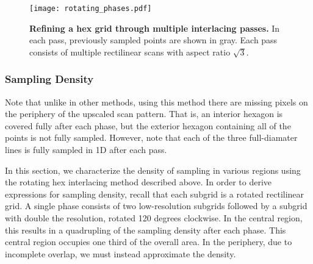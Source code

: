 \documentclass[aip, amsmath, amssymb, nobibnotes, nofootinbib, citeautoscript, reprint, superscriptaddress]{revtex4-2}
\begin{document}
    \begin{figure*}
        \texttt{[image: rotating\_phases.pdf]}
        \caption{
            \label{fig:rotatingphases} 
            \textbf{Refining a hex grid through multiple interlacing passes.}
            In each pass, previously sampled points are shown in gray.
            Each pass consists of multiple rectilinear scans with aspect ratio $\sqrt{3}$.
            }
    \end{figure*}




    \subsubsection{\label{sec:density}Sampling Density}

    Note that unlike in other methods, using this method there are missing pixels on the periphery of the upscaled scan pattern.
    That is, an interior hexagon is covered fully after each phase, but the exterior hexagon containing all of the points is not fully sampled.
    However, note that each of the three full-diamater lines is fully sampled in 1D after each pass.


    In this section, we characterize the density of sampling in various regions using the rotating hex interlacing method described above.
    In order to derive expressions for sampling density, recall that each subgrid is a rotated rectilinear grid.
    A single phase consists of two low-resolution subgrids followed by a subgrid with double the resolution, rotated 120 degrees clockwise.
    In the central region, this results in a quadrupling of the sampling density after each phase.
    This central region occupies one third of the overall area.
    In the periphery, due to incomplete overlap, we must instead approximate the density.
\end{document}
